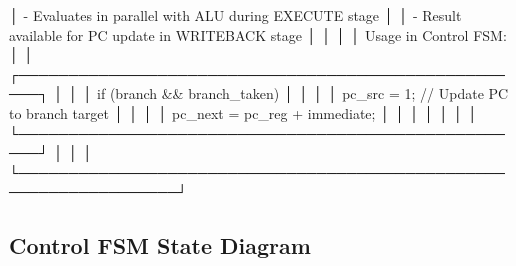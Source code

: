 \begin{record}
\begin{logblock}
│  - Evaluates in parallel with ALU during EXECUTE stage           │
│  - Result available for PC update in WRITEBACK stage             │
│                                                                  │
│  Usage in Control FSM:                                           │
│  ┌────────────────────────────────────────────────────┐          │
│  │ if (branch && branch_taken) {                      │          │
│  │   pc_src = 1;  // Update PC to branch target      │          │
│  │   pc_next = pc_reg + immediate;                   │          │
│  │ }                                                  │          │
│  └────────────────────────────────────────────────────┘          │
│                                                                  │
└──────────────────────────────────────────────────────────────────┘
\end{logblock}

\end{record}

\subsection{Control FSM State Diagram}\label{cr:fix:cpu-dataflow-diagram:control-fsm-state-diagram}

